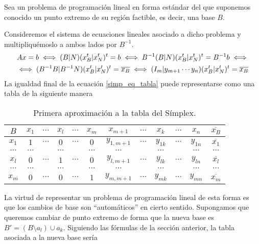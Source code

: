 Sea un problema de programación lineal en forma estándar del que suponemos conocido un punto extremo de su región factible, es decir, una base $B$.

Consideremos el sistema de ecuaciones lineales asociado a dicho problema y multipliquémoslo a ambos lados por $B^{-1}$.
\begin{multline}
	\label{simp_eq_tabla}
	Ax=b\iff (B|N)(x_B^t|x_N^t)^t=b\iff B^{-1}(B|N)(x_B^t|x_N^t)^t=B^{-1}b\iff\\
	\iff (B^{-1}B|B^{-1}N)(x_B^t|x_N^t)^t=\overline{x_B}\iff (I_m|y_{m+1}\cdots y_n)(x_B^t|x_N^t)^t=\overline{x_B}
\end{multline}
La igualdad final de la ecuación \eqref{simp_eq_tabla} puede representarse como una tabla de la siguiente manera
\begin{table}[H]
	\centering
	\begin{tabular}{c|cccccccccc|c}
		$B$      & $x_1$    & $\cdots$ & $x_l$    & $\cdots$ & $x_m$    & $x_{m+1}$   & $\cdots$ & $x_k$    & $\cdots$ & $x_n$    & $\overline{x_B}$ \\ \hline
		$x_1$    & $1$      & $\cdots$ & $0$      & $\cdots$ & $0$      & $y_{1,m+1}$ & $\cdots$ & $y_{1k}$ & $\cdots$ & $y_{1n}$ & $\overline{x_1}$ \\
		$\cdots$ & $\cdots$ &          & $\cdots$ &          & $\cdots$ & $\cdots$    &          & $\cdots$ &          & $\cdots$ & $\cdots$         \\
		$x_l$    & $0$      & $\cdots$ & $1$      & $\cdots$ & $0$      & $y_{l,m+1}$ & $\cdots$ & $y_{lk}$ & $\cdots$ & $y_{ln}$ & $\overline{x_l}$ \\
		$\cdots$ & $\cdots$ &          & $\cdots$ &          & $\cdots$ & $\cdots$    &          & $\cdots$ &          & $\cdots$ & $\cdots$         \\
		$x_m$    & $0$      & $\cdots$ & $0$      & $\cdots$ & $1$      & $y_{m,m+1}$ & $\cdots$ & $y_{mk}$ & $\cdots$ & $y_{mn}$ & $\overline{x_m}$ \\ \hline
	\end{tabular}
	\label{simp_tab_simplex1}
	\caption{Primera aproximación a la tabla del Símplex.}
\end{table}
La virtud de representar un problema de programación lineal de esta forma es que los cambios de base son ``automáticos'' en cierto sentido. Supongamos que queremos cambiar de punto extremo de forma que la nueva base es $B'=(B\setminus a_l)\cup a_k$. Siguiendo las fórmulas de la sección anterior, la tabla asociada a la nueva base sería
